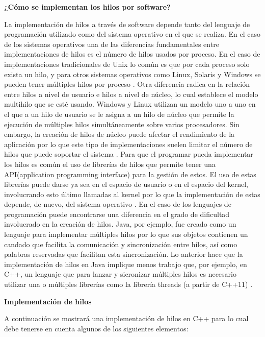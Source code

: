 \documentclass[a4paper,11pt]{article}
\begin{document}
{\large\bfseries ¿Cómo se implementan los hilos por software?  } 

La implementación de hilos a través de software depende tanto del lenguaje de programación utilizado como del sistema operativo en el que se realiza. 
En el caso de los sistemas operativos una de las diferencias fundamentales entre implementaciones de hilos es el número de hilos usados por proceso. En el caso de implementaciones tradicionales de Unix lo común es que por cada proceso solo exista un hilo, y para otros sistemas operativos como Linux, Solaris y Windows se pueden tener múltiples hilos por proceso \cite[p.169]{stallings2009operating}.
Otra diferencia radica en la relación entre hilos a nivel de usuario e hilos a nivel de núcleo, lo cual establece el modelo multihilo que se esté usando. Windows y Linux utilizan un modelo uno a uno en el que a un hilo de usuario se le asigna a un hilo de núcleo que permite la ejecución de múltiples hilos simultáneamente sobre varios procesadores. Sin embargo, la creación de hilos de núcleo puede afectar el rendimiento de la aplicación por lo que este tipo de implementaciones suelen limitar el número de hilos que puede soportar el sistema \cite[p.45]{rodriguez2007gran}.
Para que el programar pueda implementar los hilos es común el uso de librerías de hilos que permite tener una API(application programming interface) para la gestión de estos. El uso de estas librerías puede darse ya sea en el espacio de usuario o en el espacio del kernel, involucrando esto último llamadas al kernel por lo que la implementación de estas depende, de nuevo, del sistema operativo \cite[p.46]{rodriguez2007gran}.
En el caso de los lenguajes de programación puede encontrarse una diferencia en el grado de dificultad involucrado en la creación de hilos. Java, por ejemplo, fue creado como un lenguaje para implementar múltiples hilos por lo que sus objetos contienen un candado que facilita la comunicación y sincronización entre hilos, así como palabras reservadas que facilitan esta sincronización. Lo anterior hace que la implementación de hilos en Java implique menos trabajo que, por ejemplo, en C++, un lenguaje que para lanzar y sicronizar múltiples hilos es necesario utilizar una o múltiples librerías como la librería threads (a partir de C++11) \cite[p.126]{lee2017foundations}.

{\large\bfseries Implementación de hilos} 

A continuación se mostrará una implementación de hilos en C++ para lo cual debe tenerse en cuenta algunos de los siguientes elementos:
\end{document}
